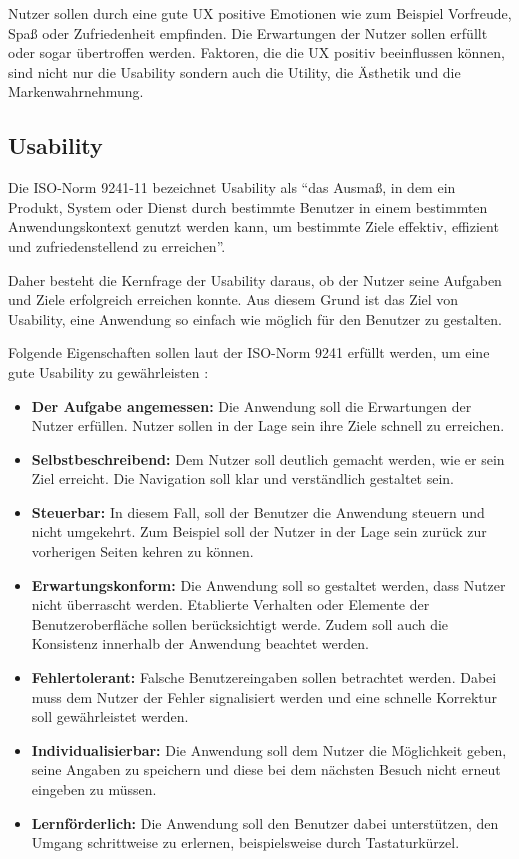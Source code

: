 Nutzer sollen durch eine gute \ac{UX} positive Emotionen wie zum Beispiel Vorfreude, Spaß oder Zufriedenheit empfinden.
Die Erwartungen der Nutzer sollen erfüllt oder sogar übertroffen werden.
Faktoren, die die \ac{UX} positiv beeinflussen können, sind nicht nur die Usability sondern auch die Utility, die Ästhetik und die Markenwahrnehmung. \citep[vgl.]{weichert_quick_2021}

\subsection{Usability}

Die ISO-Norm 9241-11 bezeichnet Usability als \enquote{das Ausmaß, in dem ein Produkt, System oder Dienst durch bestimmte Benutzer in einem bestimmten Anwendungskontext genutzt werden kann, um bestimmte Ziele effektiv, effizient und zufriedenstellend zu erreichen}.

Daher besteht die Kernfrage der Usability daraus, ob der Nutzer seine Aufgaben und Ziele erfolgreich erreichen konnte.
Aus diesem Grund ist das Ziel von Usability, eine Anwendung so einfach wie möglich für den Benutzer zu gestalten. \citep[vgl.]{jacobsen_praxisbuch_2019}

Folgende Eigenschaften sollen laut der ISO-Norm 9241 erfüllt werden, um eine gute Usability zu gewährleisten :

\begin{itemize}
	\item \textbf{Der Aufgabe angemessen:} Die Anwendung soll die Erwartungen der Nutzer erfüllen. Nutzer sollen in der Lage sein ihre Ziele schnell zu erreichen.
	\item \textbf{Selbstbeschreibend:} Dem Nutzer soll deutlich gemacht werden, wie er sein Ziel erreicht. Die Navigation soll klar und verständlich gestaltet sein.
	\item \textbf{Steuerbar:} In diesem Fall, soll der Benutzer die Anwendung steuern und nicht umgekehrt. Zum Beispiel soll der Nutzer in der Lage sein zurück zur vorherigen Seiten kehren zu können.
	\item \textbf{Erwartungskonform:} Die Anwendung soll so gestaltet werden, dass Nutzer nicht überrascht werden. Etablierte Verhalten oder Elemente der Benutzeroberfläche sollen berücksichtigt werde. Zudem soll auch die Konsistenz innerhalb der Anwendung beachtet werden.
	\item \textbf{Fehlertolerant:} Falsche Benutzereingaben sollen betrachtet werden. Dabei muss dem Nutzer der Fehler signalisiert werden und eine schnelle Korrektur soll gewährleistet werden.
	\item \textbf{Individualisierbar:} Die Anwendung soll dem Nutzer die Möglichkeit geben, seine Angaben zu speichern und diese bei dem nächsten Besuch nicht erneut eingeben zu müssen.
	\item \textbf{Lernförderlich:} Die Anwendung soll den Benutzer dabei unterstützen, den Umgang schrittweise zu erlernen, beispielsweise durch Tastaturkürzel.
\end{itemize}


